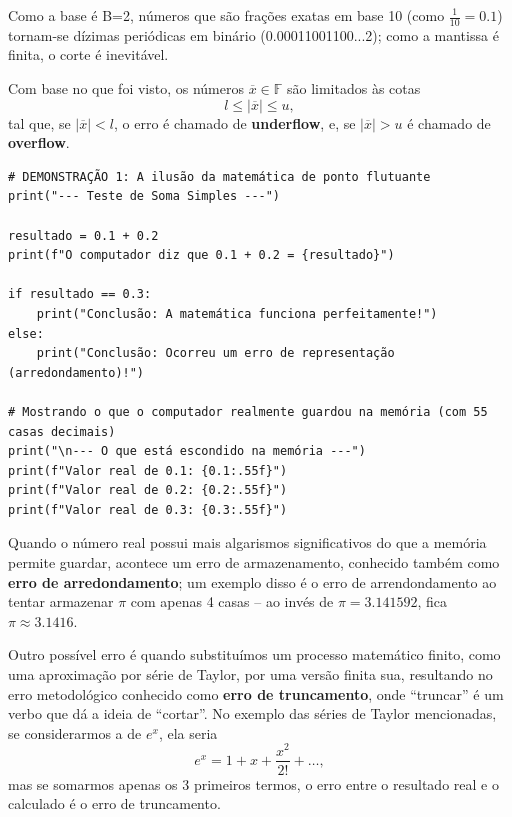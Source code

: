 \documentclass[../numerical_methods.tex]{subfiles}
\begin{document}
\begin{tcolorbox}[
		skin=enhanced,
		title=Observação,
		fonttitle=\bfseries,
		colframe=black,
		colbacktitle=cyan!75!white,
		colback=cyan!15,
		colbacklower=black,
		coltitle=black,
		drop fuzzy shadow,
	]
	Como a base é B=2, números que são frações exatas em base 10 (como \(\frac{1}{10}=0.1\)) tornam-se dízimas periódicas em binário (0.00011001100...2); como a mantissa é finita, o corte é inevitável.
\end{tcolorbox}

Com base no que foi visto, os números \(\overline{x}\in \mathbb{F}\) são limitados às cotas
\[
	l \leq | \overline{x} | \leq u,
\]
tal que, se \(| \overline{x} | < l\), o erro é chamado de \textbf{underflow}, e, se \(| \overline{x} | > u\) é chamado de \textbf{overflow}.
\begin{listing}[H]
	\begin{verbatim}
# DEMONSTRAÇÃO 1: A ilusão da matemática de ponto flutuante
print("--- Teste de Soma Simples ---")

resultado = 0.1 + 0.2
print(f"O computador diz que 0.1 + 0.2 = {resultado}")

if resultado == 0.3:
    print("Conclusão: A matemática funciona perfeitamente!")
else:
    print("Conclusão: Ocorreu um erro de representação (arredondamento)!")

# Mostrando o que o computador realmente guardou na memória (com 55 casas decimais)
print("\n--- O que está escondido na memória ---")
print(f"Valor real de 0.1: {0.1:.55f}")
print(f"Valor real de 0.2: {0.2:.55f}")
print(f"Valor real de 0.3: {0.3:.55f}")
\end{verbatim}
\end{listing}

Quando o número real possui mais algarismos significativos do que a memória permite guardar, acontece um erro de armazenamento, conhecido também como \textbf{erro de arredondamento}; um exemplo disso é o erro de arrendondamento ao tentar armazenar \(\pi \) com apenas 4 casas -- ao invés de \(\pi = 3.141592\), fica \(\pi \approx 3.1416\).

Outro possível erro é quando substituímos um processo matemático finito, como uma aproximação por série de Taylor, por uma versão finita sua, resultando no erro metodológico conhecido como \textbf{erro de truncamento}, onde ``truncar'' é um verbo que dá a ideia de ``cortar''. No exemplo das séries de Taylor mencionadas, se considerarmos a de \(e^{x}\), ela seria
\[
	e^{x} = 1 + x + \frac{x^{2}}{2!} + \dotsc ,
\]
mas se somarmos apenas os 3 primeiros termos, o erro entre o resultado real e o calculado é o erro de truncamento.
\end{document}
